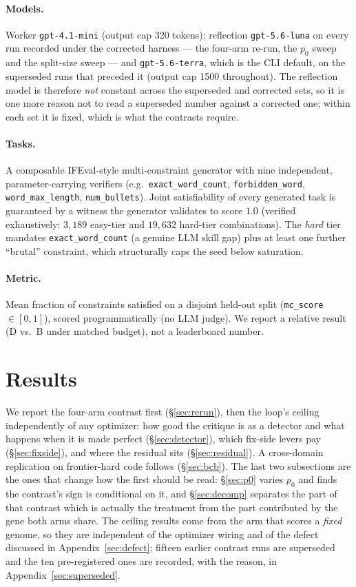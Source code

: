 \documentclass[11pt]{article}
\begin{document}
\paragraph{Models.} Worker \texttt{gpt-4.1-mini} (output cap 320 tokens); reflection
\texttt{gpt-5.6-luna} on every run recorded under the corrected harness --- the four-arm
re-run, the $p_0$ sweep and the split-size sweep --- and \texttt{gpt-5.6-terra}, which is the
CLI default, on the superseded runs that preceded it (output cap 1500 throughout). The
reflection model is therefore \emph{not} constant across the superseded and corrected sets, so
it is one more reason not to read a superseded number against a corrected one; within each set
it is fixed, which is what the contrasts require.

\paragraph{Tasks.} A composable IFEval-style \citep{zhou2023ifeval}
multi-constraint generator with nine independent, parameter-carrying verifiers
(e.g.\ \texttt{exact\_word\_count}, \texttt{forbidden\_word},
\texttt{word\_max\_length}, \texttt{num\_bullets}). Joint satisfiability of every
generated task is guaranteed by a witness the generator validates to score
$1.0$ (verified exhaustively: $3{,}189$ easy-tier and $19{,}632$ hard-tier
combinations). The \emph{hard} tier mandates \texttt{exact\_word\_count} (a
genuine LLM skill gap) plus at least one further ``brutal'' constraint, which
structurally caps the seed below saturation.

\paragraph{Metric.} Mean fraction of constraints satisfied on a disjoint
held-out split (\texttt{mc\_score} $\in [0,1]$), scored programmatically (no LLM
judge). We report a relative result (D vs.\ B under matched budget), not a
leaderboard number.


\section{Results}
\label{sec:results}

We report the four-arm contrast first (\S\ref{sec:rerun}), then the loop's ceiling
independently of any optimizer: how good the critique is as a detector and what happens when
it is made perfect (\S\ref{sec:detector}), which fix-side levers pay (\S\ref{sec:fixside}),
and where the residual sits (\S\ref{sec:residual}). A cross-domain replication on frontier-hard
code follows (\S\ref{sec:bcb}). The last two subsections are the ones that change how the
first should be read: \S\ref{sec:p0} varies $p_0$ and finds the contrast's sign is conditional
on it, and \S\ref{sec:decomp} separates the part of that contrast which is actually the
treatment from the part contributed by the gene both arms share. The ceiling results come from the arm that
scores a \emph{fixed} genome, so they are independent of the optimizer wiring and of the
defect discussed in Appendix~\ref{sec:defect}; fifteen earlier contrast runs are superseded and
the ten pre-registered ones are recorded, with the reason, in Appendix~\ref{sec:superseded}.
\end{document}
